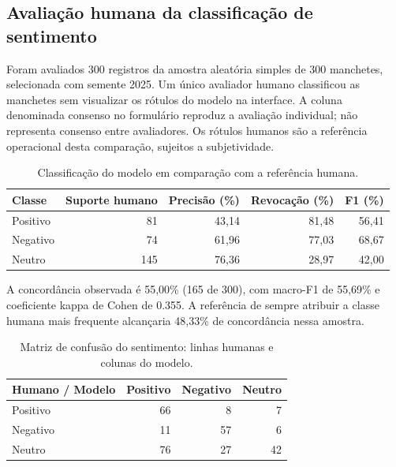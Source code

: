\subsection*{Avaliação humana da classificação de sentimento}

Foram avaliados 300 registros da amostra aleatória simples de 300 manchetes, selecionada com semente 2025. Um único avaliador humano classificou as manchetes sem visualizar os rótulos do modelo na interface. A coluna denominada consenso no formulário reproduz a avaliação individual; não representa consenso entre avaliadores. Os rótulos humanos são a referência operacional desta comparação, sujeitos a subjetividade.

\begin{table}[H]\centering\caption{Classificação do modelo em comparação com a referência humana.}

\begin{tabular}{lrrrr}\hline Classe & Suporte humano & Precisão (\%) & Revocação (\%) & F1 (\%) \\ \hline

Positivo & 81 & 43,14 & 81,48 & 56,41 \\

Negativo & 74 & 61,96 & 77,03 & 68,67 \\

Neutro & 145 & 76,36 & 28,97 & 42,00 \\

\hline\end{tabular}\par{}\end{table}

A concordância observada é 55,00\% (165 de 300), com macro-F1 de 55,69\% e coeficiente kappa de Cohen de 0.355. A referência de sempre atribuir a classe humana mais frequente alcançaria 48,33\% de concordância nessa amostra.

\begin{table}[H]\centering\caption{Matriz de confusão do sentimento: linhas humanas e colunas do modelo.}

\begin{tabular}{lrrr}\hline Humano / Modelo & Positivo & Negativo & Neutro \\ \hline

Positivo & 66 & 8 & 7\\

Negativo & 11 & 57 & 6\\

Neutro & 76 & 27 & 42\\

\hline\end{tabular}\par{}\end{table}

